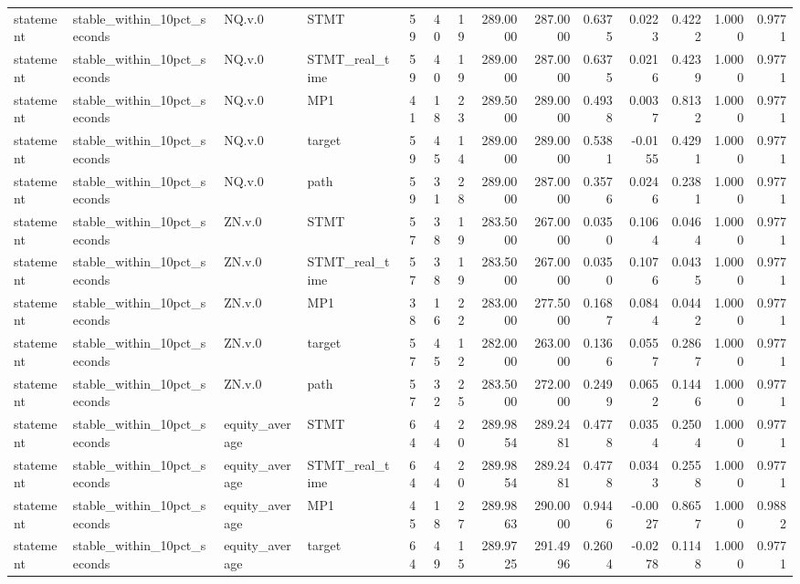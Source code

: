 \begin{tabular}{llllrrrrrrrrrr}
statement & stable_within_10pct_seconds & NQ.v.0 & STMT & 59 & 40 & 19 & 289.0000 & 287.0000 & 0.6375 & 0.0223 & 0.4222 & 1.0000 & 0.9771 \\
statement & stable_within_10pct_seconds & NQ.v.0 & STMT_real_time & 59 & 40 & 19 & 289.0000 & 287.0000 & 0.6375 & 0.0216 & 0.4239 & 1.0000 & 0.9771 \\
statement & stable_within_10pct_seconds & NQ.v.0 & MP1 & 41 & 18 & 23 & 289.5000 & 289.0000 & 0.4938 & 0.0037 & 0.8132 & 1.0000 & 0.9771 \\
statement & stable_within_10pct_seconds & NQ.v.0 & target & 59 & 45 & 14 & 289.0000 & 289.0000 & 0.5381 & -0.0155 & 0.4291 & 1.0000 & 0.9771 \\
statement & stable_within_10pct_seconds & NQ.v.0 & path & 59 & 31 & 28 & 289.0000 & 287.0000 & 0.3576 & 0.0246 & 0.2381 & 1.0000 & 0.9771 \\
statement & stable_within_10pct_seconds & ZN.v.0 & STMT & 57 & 38 & 19 & 283.5000 & 267.0000 & 0.0350 & 0.1064 & 0.0464 & 1.0000 & 0.9771 \\
statement & stable_within_10pct_seconds & ZN.v.0 & STMT_real_time & 57 & 38 & 19 & 283.5000 & 267.0000 & 0.0350 & 0.1076 & 0.0435 & 1.0000 & 0.9771 \\
statement & stable_within_10pct_seconds & ZN.v.0 & MP1 & 38 & 16 & 22 & 283.0000 & 277.5000 & 0.1687 & 0.0844 & 0.0442 & 1.0000 & 0.9771 \\
statement & stable_within_10pct_seconds & ZN.v.0 & target & 57 & 45 & 12 & 282.0000 & 263.0000 & 0.1366 & 0.0557 & 0.2867 & 1.0000 & 0.9771 \\
statement & stable_within_10pct_seconds & ZN.v.0 & path & 57 & 32 & 25 & 283.5000 & 272.0000 & 0.2499 & 0.0652 & 0.1446 & 1.0000 & 0.9771 \\
statement & stable_within_10pct_seconds & equity_average & STMT & 64 & 44 & 20 & 289.9854 & 289.2481 & 0.4778 & 0.0354 & 0.2504 & 1.0000 & 0.9771 \\
statement & stable_within_10pct_seconds & equity_average & STMT_real_time & 64 & 44 & 20 & 289.9854 & 289.2481 & 0.4778 & 0.0343 & 0.2558 & 1.0000 & 0.9771 \\
statement & stable_within_10pct_seconds & equity_average & MP1 & 45 & 18 & 27 & 289.9863 & 290.0000 & 0.9446 & -0.0027 & 0.8657 & 1.0000 & 0.9882 \\
statement & stable_within_10pct_seconds & equity_average & target & 64 & 49 & 15 & 289.9725 & 291.4996 & 0.2604 & -0.0278 & 0.1148 & 1.0000 & 0.9771 \\

\end{tabular}
